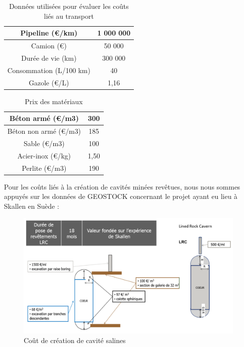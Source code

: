 \documentclass[11pt,french,a4paper]{article}
\begin{document}
\begin{table}[h]
\centering
\begin{tabular}{|c|c|}
\hline
Pipeline (€/km) &1 000 000\\
\hline
Camion (€) &50 000\\
\hline
Durée de vie (km)&300 000\\
\hline
Consommation (L/100 km)&40\\
\hline
Gazole (€/L)&1,16\\
\hline
\end{tabular}
\caption{Données utilisées pour évaluer les coûts liés au transport }
\end{table}


\begin{table}[h]
\centering
\begin{tabular}{|c|c|}
\hline
Béton armé (€/m3)&300\\
\hline
Béton non armé (€/m3)&185\\
\hline
Sable (€/m3)&100\\
\hline
Acier-inox (€/kg)&1,50\\
\hline
Perlite (€/m3)&190\\
\hline
\end{tabular}
\caption{Prix des matériaux }
\end{table}

Pour les coûts liés à la création de cavités minées revêtues, nous nous sommes appuyés sur les données de GEOSTOCK concernant le projet ayant eu lieu à Skallen en Suède :

\begin{figure}[h]
\centering
\includegraphics[width=.8\linewidth]{image/chap5/Figure éval éco création cavité.PNG}
\caption{Coût de création de cavité salines}
\end{figure}



  

  
\end{document}

